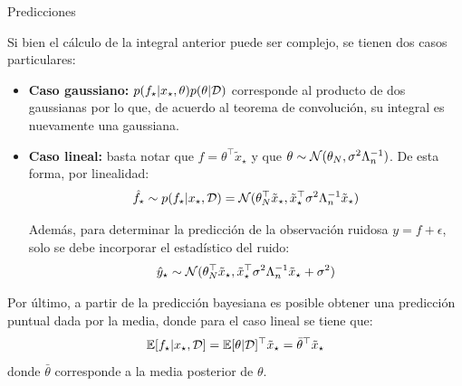 \documentclass[9pt]{beamer}
\begin{document}
\begin{frame}{Predicciones}

Si bien el cálculo de la integral anterior puede ser complejo, se tienen dos casos particulares:

\begin{itemize}
	\item \textbf{Caso gaussiano:} $p(f_\star|x_\star, \theta)p( \theta|{\mathcal D})$ corresponde al producto de dos gaussianas por lo que, de acuerdo al teorema de convolución, su integral es nuevamente una gaussiana.\pause
	\item \textbf{Caso lineal:} basta notar que $f = \theta^\top \tilde{x}_\star$ y que $\theta \sim {\mathcal N}(\theta_N,\sigma^2\Lambda_n^{-1})$. De esta forma, por linealidad:
\begin{equation*}
	\hat f_\star \sim p(f_\star|x_\star,{\mathcal D}) = {\mathcal N}(\theta_N^\top \tilde{x}_\star,\tilde{x}_\star^\top\sigma^2\Lambda_n^{-1} \tilde{x}_\star)
\end{equation*}\pause

Además, para determinar la predicción de la observación ruidosa $y=f+\epsilon$, solo se debe incorporar el estadístico del ruido:
\begin{equation*}
	\hat y_\star\sim{\mathcal N}(\theta_N^\top \tilde{x}_\star,\tilde{x}_\star^\top\sigma^2\Lambda_n^{-1} \tilde{x}_\star + \sigma^2)
\end{equation*}

\end{itemize}

\pause

Por último, a partir de la predicción bayesiana es posible obtener una predicción puntual dada por la media, donde para el caso lineal se tiene que:
\begin{equation*}
	\operatorname{\mathbb{E}}[f_\star|x_\star,{\mathcal D}] = \operatorname{\mathbb{E}}[\theta|{\mathcal D}]^\top  \tilde{x}_\star = \bar \theta^\top  \tilde{x}_\star
\end{equation*}
donde $\bar \theta$ corresponde a la media posterior de $\theta$.
	
\end{frame}
\end{document}

